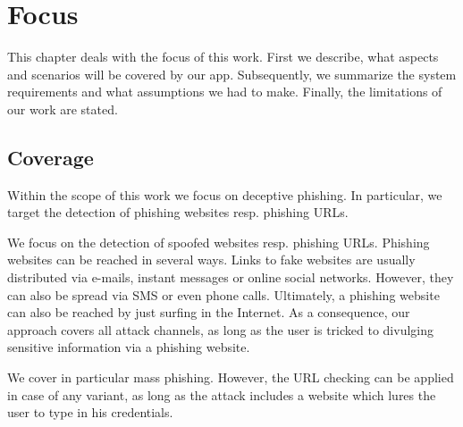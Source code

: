 \section{Focus}
\label{s:assumptions}
This chapter deals with the focus of this work. 
First we describe, what aspects and scenarios will be covered by our app. 
Subsequently, we summarize the system requirements and what assumptions we had to make. 
Finally, the limitations of our work are stated.

\subsection{Coverage}
\begin{description}[leftmargin=0cm]
	\item[Deceptive Phishing as Phishing Technique] Within the scope of this work we focus on deceptive phishing.
 In particular, we target the detection of phishing websites resp. phishing URLs.
 
	\item[Several Attack Channels] We focus on the detection of spoofed websites resp. phishing URLs.
 Phishing websites can be reached in several ways.
 Links to fake websites are usually distributed via e-mails, instant messages or online social networks.
 However, they can also be spread via SMS or even phone calls.
 Ultimately, a phishing website can also be reached by just surfing in the Internet.
 As a consequence, our approach covers all attack channels, as long as the user is tricked to divulging sensitive information via a phishing website.

	\item[Mass Phishing as Variation of Phishing] We cover in particular mass phishing.
 However, the URL checking can be applied in case of any variant, as long as the attack includes a website which lures the user to type in his credentials.


\end{description}

